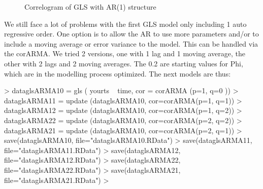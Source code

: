 \documentclass[11pt, a4paper]{article} %
\begin{document}
\begin{figure}[ht]
\begin{center}
\qquad
{}
\end{center}
\caption{Correlogram of GLS  with AR(1) structure}
\label{corglsAR}
\end{figure}


We still face a lot of problems with the first GLS model only including 1 auto regressive order. 
One option is to allow the AR to use more parameters and/or to include a moving average or error variance to the model. This can be handled via the corARMA. We tried 2 versions, one with 1 lag and 1 moving average, the other with 2 lags and 2 moving averages.
The 0.2 are starting values for Phi, which are in the modelling process optimized.
The next models are thus:
\begin{Schunk}
\begin{Sinput}
> dataglsARMA10 = gls ( yourts ~ time, cor = corARMA (p=1, q=0 ))
> dataglsARMA11 = update (dataglsARMA10, cor=corARMA(p=1, q=1))
> dataglsARMA12 = update (dataglsARMA10, cor=corARMA(p=1, q=2))
> dataglsARMA22 = update (dataglsARMA10, cor=corARMA(p=2, q=2))
> dataglsARMA21 = update (dataglsARMA10, cor=corARMA(p=2, q=1))
> save(dataglsARMA10, file="dataglsARMA10.RData")
> save(dataglsARMA11, file="dataglsARMA11.RData")
> save(dataglsARMA12, file="dataglsARMA12.RData")
> save(dataglsARMA22, file="dataglsARMA22.RData")
> save(dataglsARMA21, file="dataglsARMA21.RData")
> 
\end{Sinput}
\end{Schunk}
\end{document}
